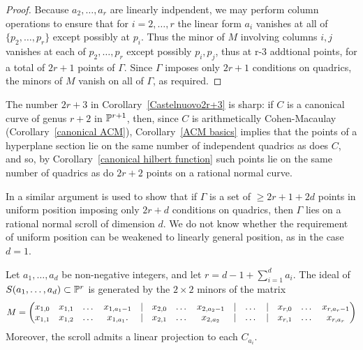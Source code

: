 \begin{proof}
Because $a_2,\dots, a_r$ are linearly indpendent,
we may perform column operations to ensure that for $i=2, \dots, r$ the linear form
$a_i$ vanishes at all of $\{p_2,\dots, p_{r}\}$ except possibly at $p_i$.
Thus the minor of $M$ involving columns $i,j$ vanishes at each of $p_2,\dots, p_r$ except possibly
$p_i,p_j$, thus at r-3 addtional points, for a total of $2r+1$ points of $\Gamma$. Since
$\Gamma$ imposes only $2r+1$ conditions on quadrics, the minors of $M$ vanish on all of $\Gamma$,
as required. 
\end{proof}

 The number $2r+3$ in Corollary~\ref{Castelnuovo2r+3} is sharp: if $C$ is a canonical curve of genus $r+2$ in ${\mathbb P}^{r+1}$, then, since $C$
is arithmetically Cohen-Macaulay (Corollary~\ref{canonical ACM}), 
Corollary~\ref{ACM basics} implies that the points of a hyperplane 
 section lie on the same number of independent quadrics as does $C$, and so,
 by Corollary~\ref{canonical hilbert function} such points lie on the same number of
 quadrics as do $2r+2$ points on a rational normal curve.

\begin{fact}
In \cite{MR685427} a similar argument is used to show that if $\Gamma$ is a set of $\geq 2r+1+2d$ points in uniform position
imposing only
$2r+d$ conditions on quadrics, then $\Gamma$ lies on a rational normal scroll of dimension $d$.
We do not know whether the requirement of uniform position can be weakened to linearly general position,
as in the case $d=1$.
\end{fact}
 
\begin{corollary}\label{equations of scrolls} Let $a_{1}, \dots, a_{d}$ be non-negative integers, and let 
$r = d-1+\sum_{i=1}^{d} a_{i}$.
The ideal of $S(a_{1},\dots,a_{d})\subset {\mathbb P}^{r}$ is generated by the $2\times 2$ minors of the matrix
{\footnotesize
$$
\setcounter{MaxMatrixCols}{20}
M = \begin{pmatrix}
x_{1,0}&x_{1,1}&\dots&x_{1, a_{1}-1}&|&x_{2,0}&\dots&x_{2, a_{2}-1}&|&\dots&|&x_{r,0}&\dots&x_{r, a_{r}-1}\\
x_{1,1}&x_{1,2}&\dots&x_{1, a_{1}}.  &|&x_{2,1}&\dots&x_{2, a_{2}}&|&\dots&|&x_{r,1}&\dots&x_{r, a_{r}}
\end{pmatrix}
$$
}
Moreover, the scroll admits a linear projection to each $C_{a_i}$.
\end{corollary}


